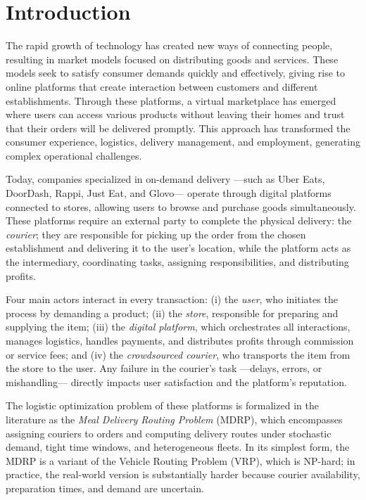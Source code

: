 \documentclass[12pt,a4paper]{report}
\begin{document}
\chapter{Introduction}
\label{ch:intro}

The rapid growth of technology has created new ways of connecting people, resulting in market models focused on distributing goods and services. These models seek to satisfy consumer demands quickly and effectively, giving rise to online platforms that create interaction between customers and different establishments. Through these platforms, a virtual marketplace has emerged where users can access various products without leaving their homes and trust that their orders will be delivered promptly. This approach has transformed the consumer experience, logistics, delivery management, and employment, generating complex operational challenges.

Today, companies specialized in on-demand delivery ---such as Uber Eats\textregistered, DoorDash\textregistered, Rappi\textregistered, Just Eat\textregistered, and Glovo\textregistered--- operate through digital platforms connected to stores, allowing users to browse and purchase goods simultaneously. These platforms require an external party to complete the physical delivery: the \emph{courier}; they are responsible for picking up the order from the chosen establishment and delivering it to the user's location, while the platform acts as the intermediary, coordinating tasks, assigning responsibilities, and distributing profits.

Four main actors interact in every transaction: (i) the \emph{user}, who initiates the process by demanding a product; (ii) the \emph{store}, responsible for preparing and supplying the item; (iii) the \emph{digital platform}, which orchestrates all interactions, manages logistics, handles payments, and distributes profits through commission or service fees; and (iv) the \emph{crowdsourced courier}, who transports the item from the store to the user. Any failure in the courier's task ---delays, errors, or mishandling--- directly impacts user satisfaction and the platform's reputation.

The logistic optimization problem of these platforms is formalized in the literature as the \emph{Meal Delivery Routing Problem} (MDRP), which encompasses assigning couriers to orders and computing delivery routes under stochastic demand, tight time windows, and heterogeneous fleets. In its simplest form, the MDRP is a variant of the Vehicle Routing Problem (VRP), which is NP-hard; in practice, the real-world version is substantially harder because courier availability, preparation times, and demand are uncertain.
\end{document}
